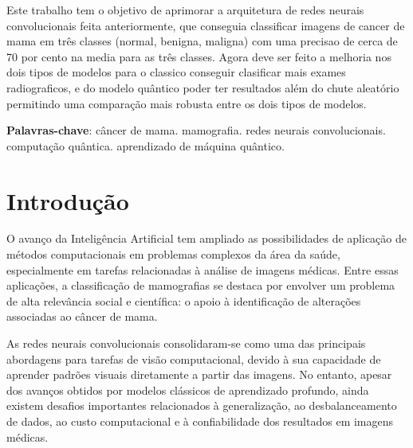 \documentclass[
    12pt,
    openright,
    oneside,
    a4paper,
    english,
    brazil
]{abntex2}
\begin{document}
\frenchspacing

\pretextual
\imprimircapa
\imprimirfolhaderosto

\begin{resumo}

Este trabalho tem o objetivo de aprimorar a arquitetura de redes neurais convolucionais feita anteriormente, que conseguia classificar imagens de cancer de mama em três classes (normal, benigna, maligna) com uma precisao de cerca de 70 por cento na media para as três classes. Agora deve ser feito a melhoria nos dois tipos de modelos para o classico conseguir clasificar mais exames radiograficos, e do modelo quântico poder ter resultados além do chute aleatório permitindo uma comparação mais robusta entre os dois tipos de modelos. 

\vspace{\onelineskip}
\noindent
\textbf{Palavras-chave}: câncer de mama. mamografia. redes neurais convolucionais. computação quântica. aprendizado de máquina quântico.
\end{resumo}

\tableofcontents*
\cleardoublepage

\textual



\chapter{Introdução}

O avanço da Inteligência Artificial tem ampliado as possibilidades de aplicação de métodos computacionais em problemas complexos da área da saúde, especialmente em tarefas relacionadas à análise de imagens médicas. Entre essas aplicações, a classificação de mamografias se destaca por envolver um problema de alta relevância social e científica: o apoio à identificação de alterações associadas ao câncer de mama. %

As redes neurais convolucionais consolidaram-se como uma das principais abordagens para tarefas de visão computacional, devido à sua capacidade de aprender padrões visuais diretamente a partir das imagens. No entanto, apesar dos avanços obtidos por modelos clássicos de aprendizado profundo, ainda existem desafios importantes relacionados à generalização, ao desbalanceamento de dados, ao custo computacional e à confiabilidade dos resultados em imagens médicas.
\end{document}
